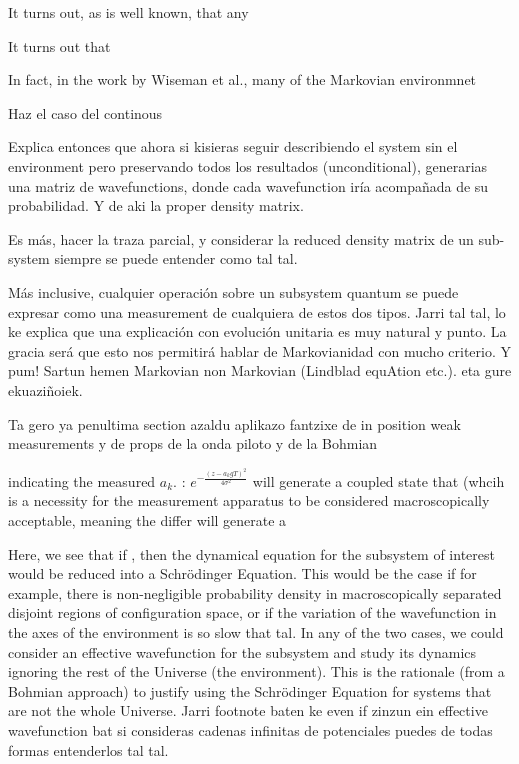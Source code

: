 \documentclass[11pt, a4paper]{article} %
\begin{document}
 

It turns out, as is well known, that any 

It turns out that 

In fact, in the work \cite{MarkovianityDefs} by Wiseman et al., many of the Markovian environmnet

Haz el caso del continous

Explica entonces que ahora si kisieras seguir describiendo el system sin el environment pero preservando todos los resultados (unconditional), generarias una matriz de wavefunctions, donde cada wavefunction iría acompañada de su probabilidad. Y de aki la proper density matrix.

Es más, hacer la traza parcial, y considerar la reduced density matrix de un sub-system siempre se puede entender como tal tal.

Más inclusive, cualquier operación sobre un subsystem quantum se puede expresar como una measurement de cualquiera de estos dos tipos. Jarri tal tal, lo ke explica que una explicación con evolución unitaria es muy natural y punto. La gracia será que esto nos permitirá hablar de Markovianidad con mucho criterio. Y pum! Sartun hemen Markovian non Markovian (Lindblad equAtion etc.). eta gure ekuaziñoiek.

Ta gero ya penultima section azaldu aplikazo fantzixe de in position weak measurements y de props de la onda piloto y de la Bohmian


 indicating the measured $a_k$. : $e^{-\frac{(z-a_kgT)^2}{4\sigma^2}}$ will generate a coupled state that  (whcih is a necessity for the measurement apparatus to be considered macroscopically acceptable, meaning the differ will generate a 


Here, we see that if , then the dynamical equation for the subsystem of interest would be reduced into a Schrödinger Equation. This would be the case if for example, there is non-negligible probability density in macroscopically separated disjoint regions of configuration space, or if the variation of the wavefunction in the axes of the environment is so slow that tal. In any of the two cases, we could consider an effective wavefunction for the subsystem and study its dynamics ignoring the rest of the Universe (the environment). This is the rationale (from a Bohmian approach) to justify using the Schrödinger Equation for systems that are not the whole Universe. Jarri footnote baten ke even if zinzun ein effective wavefunction bat si consideras cadenas infinitas de potenciales puedes de todas formas entenderlos tal tal.
\end{document}
